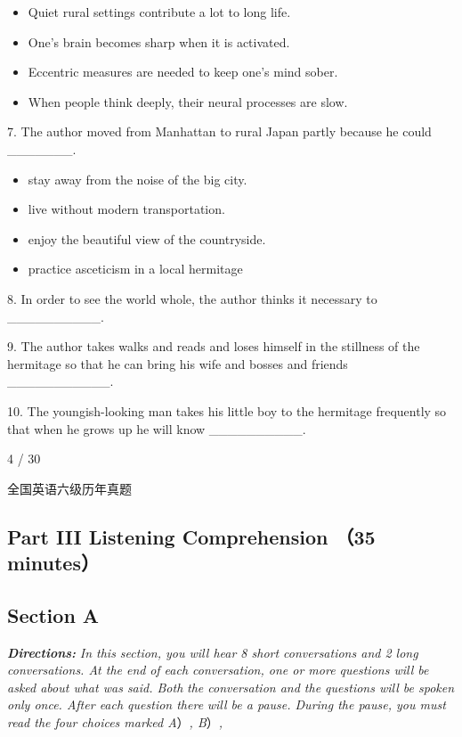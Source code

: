 \documentclass[UTF8,11pt]{ctexart}
\begin{document}
\begin{itemize}[leftmargin=2em,itemsep=.2em,topsep=.4em]\item[A.] Quiet rural settings contribute a lot to long life.
\item[B.] One’s brain becomes sharp when it is activated.
\item[C.] Eccentric measures are needed to keep one’s mind sober.
\item[D.] When people think deeply, their neural processes are slow.
\end{itemize}

7. The author moved from Manhattan to rural Japan partly because he could \_\_\_\_\_\_\_.


\begin{itemize}[leftmargin=2em,itemsep=.2em,topsep=.4em]\item[A.] stay away from the noise of the big city.
\item[B.] live without modern transportation.
\item[C.] enjoy the beautiful view of the countryside.
\item[D.] practice asceticism in a local hermitage
\end{itemize}

8. In order to see the world whole, the author thinks it necessary to \_\_\_\_\_\_\_\_\_\_.


9. The author takes walks and reads and loses himself in the stillness of the hermitage so that he can bring his wife and bosses and friends \_\_\_\_\_\_\_\_\_\_\_.


10. The youngish-looking man takes his little boy to the hermitage frequently so that when he grows up he will know \_\_\_\_\_\_\_\_\_\_.


4 / 30


全国英语六级历年真题


\subsection*{\textbf{Part III} \textbf{Listening Comprehension} （\textbf{35 minutes}）}


\subsection*{\textbf{Section A}}


\textbf{\textit{Directions:}}\textit{ In this section, you will hear 8 short conversations and 2 long conversations. At the end} \textit{of each conversation, one or more questions will be asked about what was said. Both} \textit{the conversation and the questions will be spoken only once. After each question there} \textit{will be a pause. During the pause, you must read the four choices marked A}）\textit{, B}）\textit{,}
\end{document}
